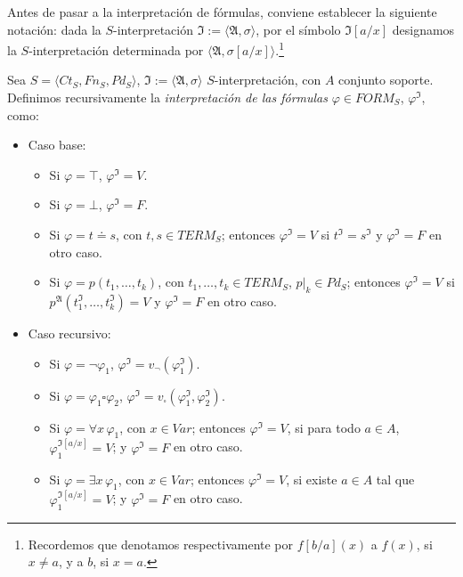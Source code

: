 Antes de pasar a la interpretación de fórmulas, conviene establecer la siguiente notación: dada la $S$-interpretación $\mathfrak{I} := \langle \mathfrak{A}, \sigma \rangle$, por el símbolo $\mathfrak{I}[a/x]$ designamos la $S$-interpretación determinada por $\langle \mathfrak{A}, \sigma[a/x]\rangle$.\footnote{Recordemos que denotamos respectivamente por $f[b/a](x)$ a $f(x)$, si $x \neq a$, y a $b$, si $x = a$.}

\begin{definition}
Sea $S = \langle Ct_{S}, Fn_{S}, Pd_{S}\rangle$, $\mathfrak{I} := \langle \mathfrak{A}, \sigma \rangle$ $S$-interpretación, con $A$ conjunto soporte.  Definimos recursivamente la \textit{interpretación de las fórmulas} $\varphi \in FORM_S$, $\varphi^{\mathfrak{I}}$, como:
\begin{itemize}
    \item Caso base:
        \begin{itemize}
            \item Si $\varphi = \top$, $\varphi^{\mathfrak{I}} = V$.
            \item Si $\varphi = \bot$, $\varphi^{\mathfrak{I}} = F$.
            \item Si $\varphi = t \doteq s$, con $t, s \in TERM_S$; entonces $\varphi^{\mathfrak{I}} = V$ si $t^{\mathfrak{I}} = s^{\mathfrak{I}}$ y $\varphi^{\mathfrak{I}} = F$ en otro caso.
            \item Si $\varphi = p(t_1, \dots, t_k)$, con $t_1, \dots, t_k \in TERM_S$, $p|_k \in Pd_S$; entonces $\varphi^{\mathfrak{I}} = V$ si $p^{\mathfrak{A}}(t_{1}^{\mathfrak{I}}, \dots, t_{k}^{\mathfrak{I}}) = V$ y $\varphi^{\mathfrak{I}} = F$ en otro caso. 
        \end{itemize}
    \item Caso recursivo:
        \begin{itemize}
            \item Si $\varphi = \neg \varphi_1$,  $\varphi^{\mathfrak{I}} = v_{\neg}(\varphi_{1}^{\mathfrak{I}})$.
            \item Si $\varphi = \varphi_1 \square \varphi_2$,  $\varphi^{\mathfrak{I}} = v_{\square}(\varphi_{1}^{\mathfrak{I}}, \varphi_{2}^{\mathfrak{I}})$.
            \item Si $\varphi = \forall x \, \varphi_1$, con $x \in Var$; entonces $\varphi^{\mathfrak{I}} = V$, si para todo $a \in A$, $\varphi_1^{\mathfrak{I}[a/x]} = V$; y $\varphi^{\mathfrak{I}} = F$ en otro caso.
            \item Si $\varphi = \exists x \, \varphi_1$, con $x \in Var$; entonces $\varphi^{\mathfrak{I}} = V$, si existe $a \in A$ tal que $\varphi_1^{\mathfrak{I}[a/x]} = V$; y $\varphi^{\mathfrak{I}} = F$ en otro caso.
        \end{itemize}
\end{itemize}
\end{definition}

